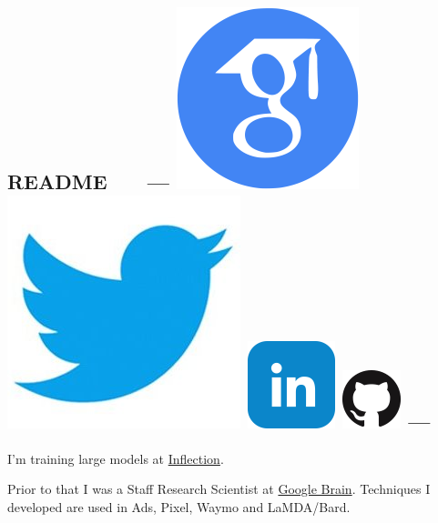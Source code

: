 \documentclass{article}
\begin{document}
\subsection*{README \ \ \ --- \protect
\href{https://scholar.google.com/citations?user=IMkVH_8AAAAJ&hl=en}{\includegraphics[natwidth=22, natheight=22]{img/google-scholar.png}}
\href{https://twitter.com/Hanxiao_6}{\includegraphics[natwidth=22, natheight=22]{img/twitter.jpg}}
\href{https://www.linkedin.com/in/hanxiao-liu-17194a4a/}{\includegraphics[natwidth=22, natheight=22]{img/linkedin.png}}
\href{https://github.com/quark0}{\includegraphics[natwidth=22, natheight=22]{img/GitHub-Mark-64px.png}}
---
}
\noindent I'm training large models at \href{https://inflection.ai}{Inflection}.

\noindent Prior to that I was a Staff Research Scientist at \href{https://ai.google/research/teams/brain}{Google Brain}. Techniques I developed are used in Ads, Pixel, Waymo and LaMDA/Bard.
\end{document}
